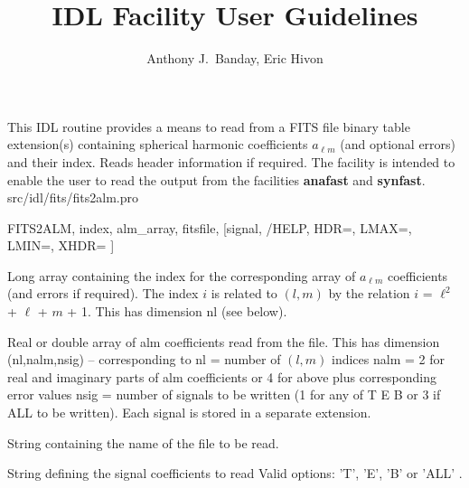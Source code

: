 



\sloppy



\title{\healpix IDL Facility User Guidelines}
 \section[fits2alm]{ }
\label{idl:fits2alm}
\author{Anthony J.~Banday, Eric Hivon}




\begin{facility}
{This IDL routine provides a means to 
read from a FITS file binary table extension(s) containing spherical
harmonic coefficients $a_{\ell m}$ (and optional errors) and their index. Reads
header information if required. The facility is intended to enable 
the user to read the output from the \healpix facilities \textbf{anafast} and \textbf{synfast}.
}
{src/idl/fits/fits2alm.pro}

\end{facility}

\begin{IDLformat}
{FITS2ALM, index, alm\_array, fitsfile, [signal, /HELP, HDR=, LMAX=, LMIN=, XHDR= ]}
\end{IDLformat}

\begin{qualifiers}
  \begin{qulist}{} %
    \item[index] Long array containing the index for the corresponding
                 array of $a_{\ell m}$ coefficients (and errors if required). The
                 index ${i}$ is related to $(l,m)$ by the relation \hfill\newline
                 $i$ = $\ell^2$ + $\ell$ + $m$ + 1. \newline This has dimension
    nl (see below).
    \item[alm\_array] Real or double array of alm coefficients read from the
      file. This has dimension (nl,nalm,nsig) -- corresponding to\hfill\newline
      nl   = number of $(l,m)$ indices \hfill\newline
      nalm = 2 for real and imaginary parts of alm coefficients or
             4 for above plus corresponding error values \hfill\newline
      nsig = number of signals to be written (1 for any of T E B
             or 3 if ALL to be written). Each signal is stored
             in a separate extension.
    \item[fitsfile] String containing the name of the file to be
      read.
    \item[signal] String defining the signal coefficients to read
                  Valid options: 'T', 'E', 'B' or 'ALL' \hfill\newline
	.  
  \end{qulist}
\end{qualifiers}

